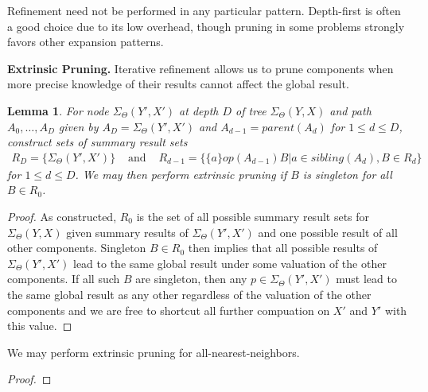 \documentclass{article}
\newtheorem{lemma}{Lemma}
\newcommand{\GNP}[1][\psi]{{#1}_{\Theta}}
\begin{document}
Refinement need not be performed in any particular pattern.
Depth-first is often a good choice due to its low overhead, though
pruning in some problems strongly favors other expansion patterns.


{\bf Extrinsic Pruning.}  Iterative refinement allows us to prune
components when more precise knowledge of their results cannot affect
the global result.
\begin{lemma}
  For node $\GNP[\Sigma](Y',X')$ at depth $D$ of tree
  $\GNP[\Sigma](Y,X)$ and path $A_0,\ldots,A_D$ given by $A_D =
  \GNP[\Sigma](Y',X')$ and $A_{d-1} = parent(A_{d})$ for $1 \leq d
  \leq D$, construct sets of summary result sets
  \[ \begin{array}{rcl}
    R_D = \{\GNP[\Sigma](Y',X')\} & \mbox{ and } & R_{d-1} = \{\{a\} \mathbin{op(A_{d-1})} B | a \in sibling(A_d), B \in R_d\}
  \end{array} \]
  for $1 \leq d \leq D$.  We may then perform {\em extrinsic pruning}
  if $B$ is singleton for all $B \in R_0$.
\end{lemma}
\begin{proof}
  As constructed, $R_0$ is the set of all possible summary result sets
  for $\GNP[\Sigma](Y,X)$ given summary results of
  $\GNP[\Sigma](Y',X')$ and one possible result of all other
  components.  Singleton $B \in R_0$ then implies that all possible
  results of $\GNP[\Sigma](Y',X')$ lead to the same global result
  under some valuation of the other components.  If all such $B$ are
  singleton, then any $p \in \GNP[\Sigma](Y',X')$ must lead to the
  same global result as any other regardless of the valuation of the
  other components and we are free to shortcut all further compuation
  on $X'$ and $Y'$ with this value.
\end{proof}

\begin{corellary}
  We may perform extrinsic pruning for all-nearest-neighbors.
\end{corellary}
\begin{proof}
  
\end{proof}

\end{document}
